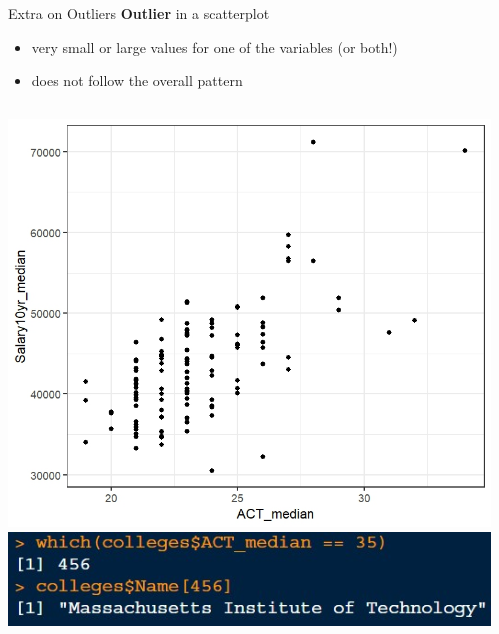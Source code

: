\documentclass{beamer}
\begin{document}
\begin{frame}{Extra on Outliers}
\textbf{Outlier} in a scatterplot
\begin{itemize}
    \item very small or large values for one of the variables (or both!)
    \item does not follow the overall pattern
\end{itemize}

\begin{columns}
 \begin{column}{0.45\textwidth}
 \begin{center}
    \includegraphics[scale=.4]{img/ACT_salary_scatter.jpeg}
    \includegraphics[scale=.5]{img/MIT_scatter_outlier.jpg}
\end{center}
 \end{column}
 \begin{column}{0.45\textwidth}
 \begin{center}

\end{center}
\end{column}
\end{columns}
\end{frame}
\end{document}
